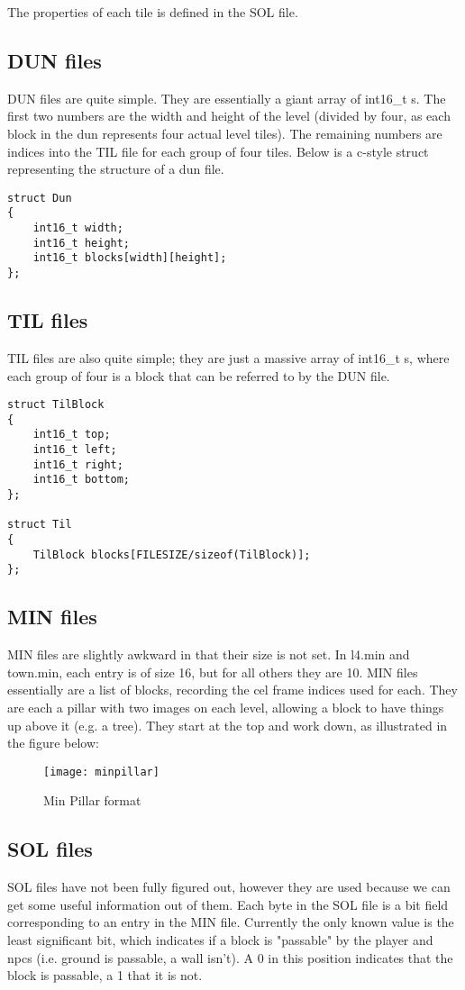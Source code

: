     The properties of each tile is defined in the SOL file.

    \subsection{DUN files}
    DUN files are quite simple. They are essentially a giant array of int16\_t s. The first two numbers are the width and height of the level (divided by four, as each block in the dun represents four actual level tiles). The remaining numbers are indices into the TIL file for each group of four tiles. Below is a c-style struct representing the structure of a dun file.
    \begin{lstlisting}
struct Dun
{
    int16_t width;
    int16_t height;
    int16_t blocks[width][height];
};
    \end{lstlisting}

    \subsection{TIL files}
    TIL files are also quite simple; they are just a massive array of int16\_t s, where each group of four is a block that can be referred to by the DUN file.

    \begin{lstlisting}
struct TilBlock
{
    int16_t top;
    int16_t left;
    int16_t right;
    int16_t bottom;
};

struct Til
{
    TilBlock blocks[FILESIZE/sizeof(TilBlock)];
};
    \end{lstlisting}

    \subsection{MIN files}
    MIN files are slightly awkward in that their size is not set. In l4.min and town.min, each entry is of size 16, but for all others they are 10.
    MIN files essentially are a list of blocks, recording the cel frame indices used for each. They are each a pillar with two images on each level, allowing a block to have things up above it (e.g. a tree). They start at the top and work down, as illustrated in the figure below:\\
	\begin{figure}
		\centering    
    	\texttt{[image: minpillar]}
    	\caption{Min Pillar format}
   	\end{figure}    	
    
    \subsection{SOL files}
    SOL files have not been fully figured out, however they are used because we can get some useful information out of them.
    Each byte in the SOL file is a bit field corresponding to an entry in the MIN file. Currently the only known value is the least significant bit, which indicates if a block is "passable" by the player and npcs (i.e. ground is passable, a wall isn't). A 0 in this position indicates that the block is passable, a 1 that it is not.
